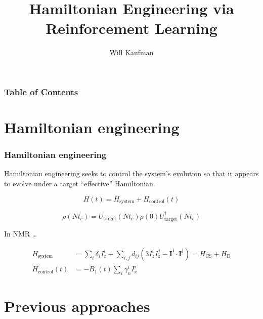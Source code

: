 \documentclass{beamer}
\title{Hamiltonian Engineering via Reinforcement Learning}
\author{Will Kaufman}
\institute{Ramanathan Group \\ Dartmouth College}
\begin{document}
\frame{\titlepage}

\begin{frame}
\frametitle{Table of Contents}
\tableofcontents
\end{frame}

\section{Hamiltonian engineering}

\begin{frame}
\frametitle{Hamiltonian engineering}

Hamiltonian engineering seeks to control the system's evolution so that it appears to evolve under a target ``effective'' Hamiltonian.

\begin{equation}
    H(t) = H_\text{system} + H_\text{control}(t)
\end{equation}

\begin{equation}\label{eq:strob_measure}
    \rho(Nt_c) = U_\text{target}(Nt_c) \rho(0) U_\text{target}^\dagger(Nt_c)
\end{equation}

\pause

In NMR \cite{1976ii}\dots

\begin{align}\label{eq:ham_spin}
    H_\text{system} &= \sum_i \delta_i I_z^i + \sum_{i,j} d_{ij} \left( 3I_z^iI_z^j - \mathbf{I^i} \cdot \mathbf{I^j} \right)
    = H_\text{CS} + H_\text{D} \\
    H_\text{control}(t) &= -B_1(t) \sum_i \gamma_n^i I_x^i
\end{align}

\end{frame}

\section{Previous approaches}
\end{document}
